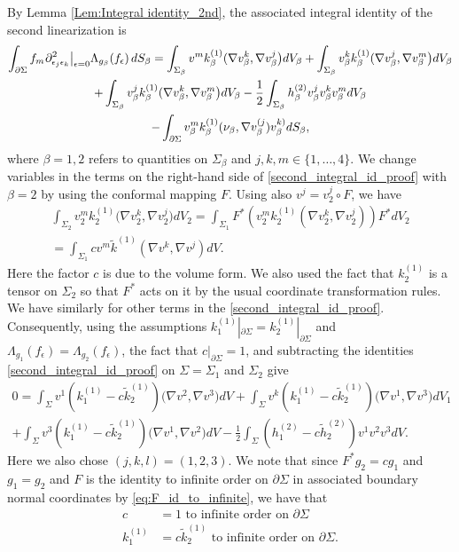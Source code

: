 \documentclass[12pt]{amsart}
\def\p{\partial}
\theoremstyle{definition}
\theoremstyle{remark}
\newcommand{\eps}{\epsilon}
\newcommand{\s}{\hspace{0.5pt}}
\begin{document}
By Lemma \ref{Lem:Integral identity_2nd}, the associated integral identity   of the second linearization is
\begin{multline}\label{second_integral_id_proof}
	 \int_{\p \Sigma} f_m \s \p^2_{\eps_j \eps_k}\big|_{\epsilon=0} \Lambda_{g_\beta} (f_\epsilon) \, dS_\beta =\int_{\Sigma_\beta} v^m k_\beta^{(1)}(\nabla v_\beta^k,\nabla v_\beta^j\big)dV_\beta+\int_{\Sigma_\beta}v_\beta^k k_\beta^{(1)}(\nabla v_\beta^j,\nabla v_\beta^m\big)dV_\beta\\
 +\int_{\Sigma_\beta} v_\beta^j k_\beta^{(1)}(\nabla v_\beta^k,\nabla v_\beta^m\big)dV_\beta -\frac{1}{2}\int_{\Sigma_\beta} h_\beta^{(2)}v_\beta^jv_\beta^kv_\beta^mdV_\beta  \\
 - \int_{\p \Sigma} v_\beta^m k_\beta^{(1)}(\nu_\beta,\nabla v_\beta^{(j})v_\beta^{k)}dS_\beta,
 \end{multline}
 where $\beta=1,2$ refers to quantities on $\Sigma_\beta$ and $j,k,m\in \{1,\ldots,4\}$.    
 We change variables in the terms on the right-hand side of \eqref{second_integral_id_proof}  with $\beta = 2$ by using the conformal mapping $F$. 
		Using also $ v^{j}=v_2^{j}\circ F$,
		we have
		\begin{multline*}
		 \int_{\Sigma_2} v_2^m k_2^{(1)}(\nabla v_2^k,\nabla v_2^j\big)dV_2=\int_{\Sigma_1} F^*\left(v_2^m k_2^{(1)}(\nabla v_2^k,\nabla v_2^j)\right)F^*dV_2 \\
		 =\int_{\Sigma_1} c v^m \tilde k^{(1)}(\nabla v^k,\nabla v^j)dV.
		\end{multline*}
		Here the factor $c$ is due to the volume form. We also used the fact that $k_2^{(1)}$ is a tensor on $\Sigma_2$ so that $F^*$ acts on it by the usual coordinate transformation rules.  We have similarly for other terms in the \eqref{second_integral_id_proof}. Consequently, using the assumptions $k_1^{(1)}|_{\p \Sigma}=k_2^{(1)}|_{\p \Sigma}$ and $\Lambda_{g_1} (f_\epsilon) =\Lambda_{g_2} (f_\epsilon)$, the fact that $c|_{\p \Sigma}=1$,  and subtracting the identities \eqref{second_integral_id_proof} on $\Sigma=\Sigma_1$ and $\Sigma_2$ give 
\begin{multline}\label{eq:2nd_ord_recovery_proof}
 0=\int_{\Sigma} v^1 (k^{(1)}_1-c\tilde k^{(1)}_2)(\nabla v^2,\nabla v^3\big)dV+\int_{\Sigma}v^k (k^{(1)}_1-c\tilde k^{(1)}_2)(\nabla v^1,\nabla v^3\big)dV_1\\
 +\int_{\Sigma} v^3 (k^{(1)}_1-c\tilde k^{(1)}_2)(\nabla v^1,\nabla v^2\big)dV -\frac{1}{2}\int_{\Sigma} (h^{(2)}_1-c\tilde h^{(2)}_2)v^1v^2v^3dV.
\end{multline}
Here we also chose $(j,k,l)=(1,2,3)$. We note that since $F^*g_2=c g_1$ and $g_1=g_2$ and $F$ is the identity to infinite order on $\p \Sigma$ in associated boundary normal coordinates by \eqref{eq:F_id_to_infinite}, we have that 
\begin{align*}\label{eq:c_is_1_to_infinite}
 c&=1 \text{ to infinite order on } \p\Sigma \\
 k^{(1)}_1&=c\tilde k^{(1)}_2 \text{ to infinite order on } \p\Sigma.
\end{align*}
\end{document}
